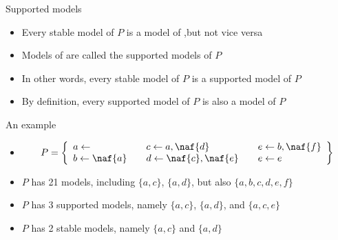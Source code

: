 \begin{frame}{Supported models}
  \bigskip
  \begin{itemize}
  \item<1-> Every stable model of $P$ is a model of ,\pause[2]
    but not vice versa
    \smallskip
  \item<3-> Models of  are called the \alert{supported models} of $P$
    \bigskip
  \item<4-> In other words, every stable model of $P$ is a supported model of $P$
  \item<4-> By definition, every supported model of $P$ is also a model of $P$
\end{itemize}

\end{frame}
\begin{frame}{An example}
  \bigskip
  \begin{itemize}
  \item<1-> []
    \[
    P
    =
    \left\{
      \begin{array}{lll}
        a \leftarrow                  \quad &
        c \leftarrow a, \naf{d}       \quad &
        e \leftarrow b, \naf{f}
        \\
        b \leftarrow \naf{a}          \quad &
        d \leftarrow \naf{c}, \naf{e} \quad &
        e \leftarrow e
      \end{array}
    \right\}
    \]
  \bigskip
  \item<2-> $P$ has 21           models, including $\{a,c\}$, $\{a,d\}$, but also $\{a,b,c,d,e,f\}$
  \item<3-> $P$ has  3 supported models, namely $\{a,c\}$, $\{a,d\}$, and $\{a,c,e\}$
  \item<4-> $P$ has  2 stable    models, namely $\{a,c\}$ and $\{a,d\}$
  \end{itemize}

\end{frame}

